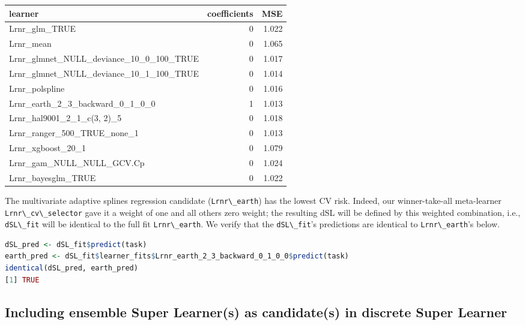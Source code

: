 \documentclass[
  12pt, krantz2,
]{krantz}
\newcommand{\passthrough}[1]{#1}
\newcommand{\1}{\mathbbm{1}}
\theoremstyle{definition}
\theoremstyle{definition}
\theoremstyle{definition}
\theoremstyle{definition}
\theoremstyle{remark}
\begin{document}
\begin{tabular}{l|r|r}
\hline
learner & coefficients & MSE\\
\hline
Lrnr\_glm\_TRUE & 0 & 1.022\\
\hline
Lrnr\_mean & 0 & 1.065\\
\hline
Lrnr\_glmnet\_NULL\_deviance\_10\_0\_100\_TRUE & 0 & 1.017\\
\hline
Lrnr\_glmnet\_NULL\_deviance\_10\_1\_100\_TRUE & 0 & 1.014\\
\hline
Lrnr\_polspline & 0 & 1.016\\
\hline
Lrnr\_earth\_2\_3\_backward\_0\_1\_0\_0 & 1 & 1.013\\
\hline
Lrnr\_hal9001\_2\_1\_c(3, 2)\_5 & 0 & 1.018\\
\hline
Lrnr\_ranger\_500\_TRUE\_none\_1 & 0 & 1.013\\
\hline
Lrnr\_xgboost\_20\_1 & 0 & 1.079\\
\hline
Lrnr\_gam\_NULL\_NULL\_GCV.Cp & 0 & 1.024\\
\hline
Lrnr\_bayesglm\_TRUE & 0 & 1.022\\
\hline
\end{tabular}

The multivariate adaptive splines regression candidate (\passthrough{\lstinline!Lrnr\_earth!}) has the
lowest CV risk. Indeed, our winner-take-all meta-learner \passthrough{\lstinline!Lrnr\_cv\_selector!}
gave it a weight of one and all others zero weight; the resulting dSL will be
defined by this weighted combination, i.e., \passthrough{\lstinline!dSL\_fit!} will be identical to the
full fit \passthrough{\lstinline!Lrnr\_earth!}. We verify that the \passthrough{\lstinline!dSL\_fit!}'s predictions are identical
to \passthrough{\lstinline!Lrnr\_earth!}'s below.

\begin{lstlisting}[language=R]
dSL_pred <- dSL_fit$predict(task)
earth_pred <- dSL_fit$learner_fits$Lrnr_earth_2_3_backward_0_1_0_0$predict(task)
identical(dSL_pred, earth_pred)
[1] TRUE
\end{lstlisting}

\hypertarget{including-ensemble-super-learners-as-candidates-in-discrete-super-learner}{%
\subsection{Including ensemble Super Learner(s) as candidate(s) in discrete Super Learner}\label{including-ensemble-super-learners-as-candidates-in-discrete-super-learner}}
\end{document}
